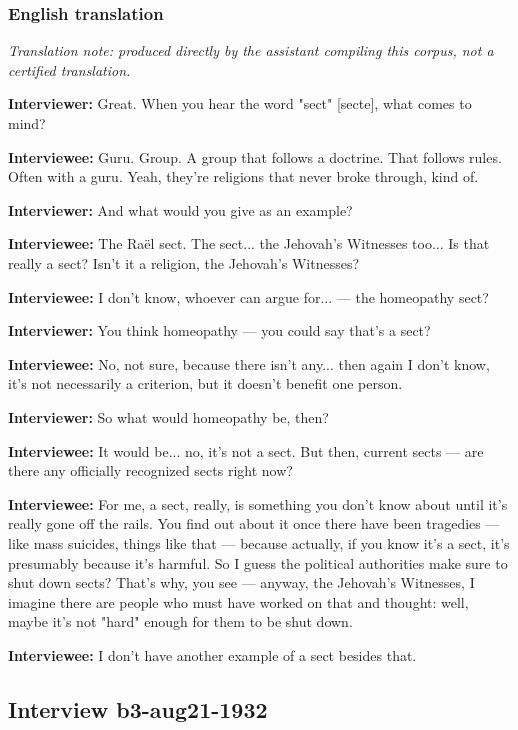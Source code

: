 \subsubsection*{English translation}
\textit{Translation note: produced directly by the assistant compiling this corpus, not a certified translation.}

\textbf{Interviewer:} Great. When you hear the word "sect" [secte], what comes to mind?

\textbf{Interviewee:} Guru. Group. A group that follows a doctrine. That follows rules. Often with a guru. Yeah, they're religions that never broke through, kind of.

\textbf{Interviewer:} And what would you give as an example?

\textbf{Interviewee:} The Raël sect. The sect... the Jehovah's Witnesses too... Is that really a sect? Isn't it a religion, the Jehovah's Witnesses?

\textbf{Interviewee:} I don't know, whoever can argue for... — the homeopathy sect?

\textbf{Interviewer:} You think homeopathy — you could say that's a sect?

\textbf{Interviewee:} No, not sure, because there isn't any... then again I don't know, it's not necessarily a criterion, but it doesn't benefit one person.

\textbf{Interviewer:} So what would homeopathy be, then?

\textbf{Interviewee:} It would be... no, it's not a sect. But then, current sects — are there any officially recognized sects right now?

\textbf{Interviewee:} For me, a sect, really, is something you don't know about until it's really gone off the rails. You find out about it once there have been tragedies — like mass suicides, things like that — because actually, if you know it's a sect, it's presumably because it's harmful. So I guess the political authorities make sure to shut down sects? That's why, you see — anyway, the Jehovah's Witnesses, I imagine there are people who must have worked on that and thought: well, maybe it's not "hard" enough for them to be shut down.

\textbf{Interviewee:} I don't have another example of a sect besides that.

\subsection{Interview b3-aug21-1932}\label{int:b3-aug21-1932}
